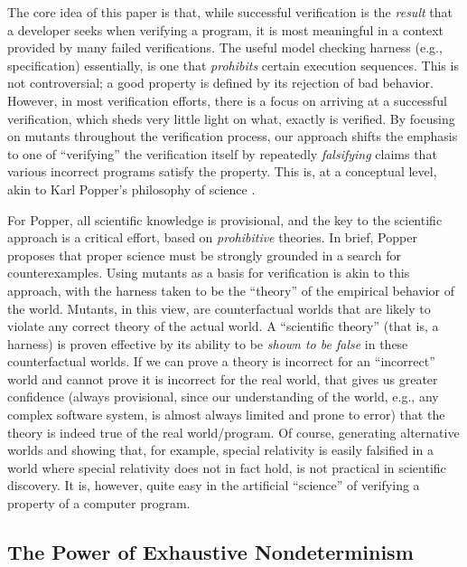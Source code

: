 \documentclass[conference]{IEEEtran}
\begin{document}
The core idea of this paper is that, while successful verification is
the \emph{result} that a developer seeks when verifying a program, it
is most meaningful in a context provided by many failed verifications.
The useful model checking harness (e.g., specification) essentially,
is one that \emph{prohibits} certain execution sequences.  This is not
controversial; a good property is defined by its rejection of bad
behavior.  However, in most verification efforts, there is a focus on
arriving at a successful verification, which sheds very little light
on what, exactly is verified.  By focusing on mutants throughout the
verification process, our approach shifts the emphasis to one of
``verifying'' the verification itself by repeatedly \emph{falsifying}
claims that various incorrect programs satisfy the property.  This is,
at a conceptual level, akin to Karl Popper's philosophy of science
\cite{Popper}.

For Popper, all scientific knowledge is provisional, and the key to
the scientific approach is a critical effort, based on
\emph{prohibitive} theories.  In brief, Popper proposes that proper
science must be strongly grounded in a search for counterexamples.
Using mutants as a basis for verification is akin to this approach,
with the harness taken to be the ``theory'' of the empirical behavior
of the world.  Mutants, in this view, are counterfactual worlds that
are likely to violate any correct theory of the actual world.  A
``scientific theory'' (that is, a harness) is proven effective by its
ability to be \emph{shown to be false} in these counterfactual worlds.
If we can prove a theory is incorrect for an ``incorrect'' world and
cannot prove it is incorrect for the real world, that gives us greater
confidence (always provisional, since our understanding of the world,
e.g., any complex software system, is almost always limited and prone
to error) that the theory is indeed true of the real world/program.
Of course, generating alternative worlds and showing that, for
example, special relativity is easily falsified in a world where
special relativity does not in fact hold, is not practical in
scientific discovery.  It is, however, quite easy in the artificial
``science'' of verifying a property of a computer program.

\subsection{The Power of Exhaustive Nondeterminism}
\end{document}
